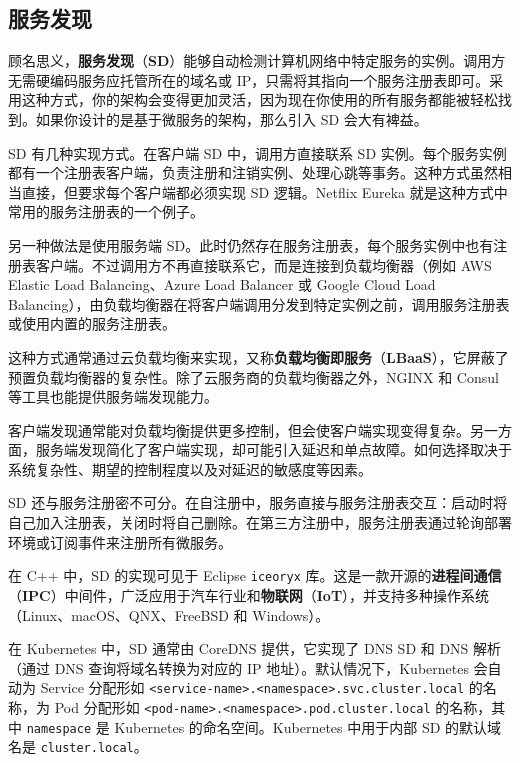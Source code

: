 \subsection{服务发现}

\label{idx:1936}
\label{idx:1937}
顾名思义，\textbf{服务发现}（\textbf{SD}）能够自动检测计算机网络中特定服务的实例。调用方无需硬编码服务应托管所在的域名或 IP，只需将其指向一个服务注册表即可。采用这种方式，你的架构会变得更加灵活，因为现在你使用的所有服务都能被轻松找到。如果你设计的是基于微服务的架构，那么引入 SD 会大有裨益。

SD 有几种实现方式。在客户端 SD 中，调用方直接联系 SD 实例。每个服务实例都有一个注册表客户端，负责注册和注销实例、处理心跳等事务。这种方式虽然相当直接，但要求每个客户端都必须实现 SD 逻辑。Netflix Eureka 就是这种方式中常用的服务注册表的一个例子。


\label{idx:1938}
另一种做法是使用服务端 SD。此时仍然存在服务注册表，每个服务实例中也有注册表客户端。不过调用方不再直接联系它，而是连接到负载均衡器（例如 AWS Elastic Load Balancing、Azure Load Balancer 或 Google Cloud Load Balancing），由负载均衡器在将客户端调用分发到特定实例之前，调用服务注册表或使用内置的服务注册表。


\label{idx:1939}
这种方式通常通过云负载均衡来实现，又称\textbf{负载均衡即服务}（\textbf{LBaaS}），它屏蔽了预置负载均衡器的复杂性。除了云服务商的负载均衡器之外，NGINX 和 Consul 等工具也能提供服务端发现能力。

客户端发现通常能对负载均衡提供更多控制，但会使客户端实现变得复杂。另一方面，服务端发现简化了客户端实现，却可能引入延迟和单点故障。如何选择取决于系统复杂性、期望的控制程度以及对延迟的敏感度等因素。

SD 还与服务注册密不可分。在自注册中，服务直接与服务注册表交互：启动时将自己加入注册表，关闭时将自己删除。在第三方注册中，服务注册表通过轮询部署环境或订阅事件来注册所有微服务。

\label{idx:1940}
\label{idx:1941}
在 C++ 中，SD 的实现可见于 Eclipse \texttt{iceoryx} 库。这是一款开源的\textbf{进程间通信}（\textbf{IPC}）中间件，广泛应用于汽车行业和\textbf{物联网}（\textbf{IoT}），并支持多种操作系统（Linux、macOS、QNX、FreeBSD 和 Windows）。

在 Kubernetes 中，SD 通常由 CoreDNS 提供，它实现了 DNS SD 和 DNS 解析（通过 DNS 查询将域名转换为对应的 IP 地址）。默认情况下，Kubernetes 会自动为 Service 分配形如 \texttt{<service-name>.\allowbreak{}<namespace>.\allowbreak{}svc.\allowbreak{}cluster.\allowbreak{}local} 的名称，为 Pod 分配形如 \texttt{<pod-name>.\allowbreak{}<namespace>.\allowbreak{}pod.\allowbreak{}cluster.\allowbreak{}local} 的名称，其中 \texttt{namespace} 是 Kubernetes 的命名空间。Kubernetes 中用于内部 SD 的默认域名是 \texttt{cluster.\allowbreak{}local}。

